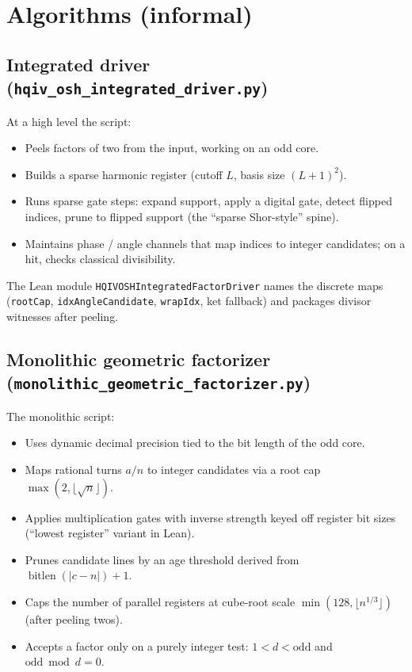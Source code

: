 \documentclass[11pt,a4paper]{article}
\newcommand{\bitlen}{\operatorname{bitlen}}
\theoremstyle{plain}
\theoremstyle{definition}
\theoremstyle{remark}
\begin{document}
\section{Algorithms (informal)}

\subsection{Integrated driver (\texttt{hqiv\_osh\_integrated\_driver.py})}

At a high level the script:
\begin{itemize}
\item Peels factors of two from the input, working on an odd core.
\item Builds a sparse harmonic register (cutoff $L$, basis size $(L{+}1)^2$).
\item Runs sparse gate steps: expand support, apply a digital gate, detect flipped
      indices, prune to flipped support (the ``sparse Shor-style'' spine).
\item Maintains phase / angle channels that map indices to integer candidates; on a
      hit, checks classical divisibility.
\end{itemize}

The Lean module \texttt{HQIVOSHIntegratedFactorDriver} names the discrete maps
(\texttt{rootCap}, \texttt{idxAngleCandidate}, \texttt{wrapIdx}, ket fallback) and
packages divisor witnesses after peeling.

\subsection{Monolithic geometric factorizer (\texttt{monolithic\_geometric\_factorizer.py})}

The monolithic script:
\begin{itemize}
\item Uses dynamic decimal precision tied to the bit length of the odd core.
\item Maps rational turns $a/n$ to integer candidates via a root cap
      $\max(2,\lfloor\sqrt{n}\rfloor)$.
\item Applies multiplication gates with inverse strength keyed off register bit sizes
      (``lowest register'' variant in Lean).
\item Prunes candidate lines by an age threshold derived from
      $\bitlen(|c-n|)+1$.
\item Caps the number of parallel registers at cube-root scale
      $\min(128,\lfloor n^{1/3}\rfloor)$ (after peeling twos).
\item Accepts a factor only on a purely integer test: $1<d<\text{odd}$ and
      $\text{odd}\bmod d = 0$.
\end{itemize}
\end{document}

